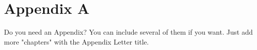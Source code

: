 \appendix
\chapter{Appendix A}

Do you need an Appendix?  You can include several of them if you want.  Just add more "chapters" with the Appendix Letter title.

